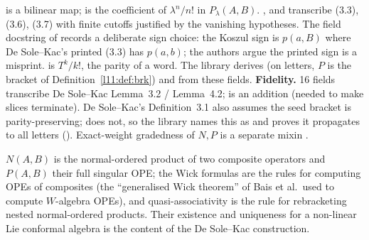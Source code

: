 \begin{dictionary}
 is a bilinear map;  is the coefficient of $\lambda^n/n!$ in
$P_\lambda(A,B)$. ,  and  transcribe (3.3), (3.6), (3.7) with finite cutoffs 
justified by the vanishing hypotheses. The field docstring of  records a deliberate sign choice: the Koszul
sign is $p(a,B)$ where De Sole--Kac's printed (3.3) has $p(a,b)$; the authors argue the printed sign is a misprint.  is $T^k/k!$,
 the parity of a word. The library derives  (on letters, $P$ is the bracket of
Definition~\ref{l11:def:brk}) and  from these fields. \textbf{Fidelity.} 16 fields transcribe De
Sole--Kac Lemma~3.2 / Lemma~4.2;  is an addition (needed to make slices terminate). De Sole--Kac's
Definition~3.1 also assumes the seed bracket is parity-preserving;  does not, so the library names this as
\allowbreak{} and proves it propagates to all letters (). Exact-weight
gradedness of $N,P$ is a separate mixin .
\end{dictionary}

\begin{physics}
$N(A,B)$ is the normal-ordered product of two composite operators and $P(A,B)$ their full singular OPE; the Wick formulas are the
rules for computing OPEs of composites (the ``generalised Wick theorem'' of Bais et al.\ used to compute $W$-algebra OPEs), and
quasi-associativity is the rule for rebracketing nested normal-ordered products. Their existence and uniqueness for a non-linear
Lie conformal algebra is the content of the De Sole--Kac construction.
\end{physics}

